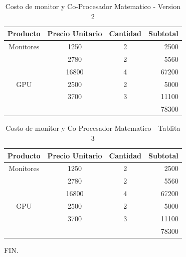 \documentclass{article}
\begin{document}
\lipsum[5-9]

\begin{table}[h]
	\centering
	\begin{tabular}{cccr}
		\hline
		Producto & Precio Unitario & Cantidad & Subtotal \\
		\hline
		Monitores & 1250 & 2 & 2500\\
		& 2780 & 2 & 5560\\
		& 16800 & 4 & 67200\\
		\hline
		GPU		  & 2500 & 2 & 5000\\
		& 3700 & 3 & 11100\\
		\cline{4-4}
		&      &   & 78300
	\end{tabular}
	\caption{Costo de monitor y Co-Procesador Matematico - Version 2}
	\label{table:2}
\end{table}

\lipsum[11-14]

\begin{table}[h]
	\centering
	\begin{tabular}{cccr}
		\hline
		Producto & Precio Unitario & Cantidad & Subtotal \\
		\hline
		Monitores & 1250 & 2 & 2500\\
		& 2780 & 2 & 5560\\
		& 16800 & 4 & 67200\\
		\hline
		GPU		  & 2500 & 2 & 5000\\
		& 3700 & 3 & 11100\\
		\cline{4-4}
		&      &   & 78300
	\end{tabular} 
	\caption{Costo de monitor y Co-Procesador Matematico - Tablita 3}
	\label{table:3}
\end{table}

FIN.

\newpage
\listoftables
\listoffigures
\tableofcontents
\end{document}
